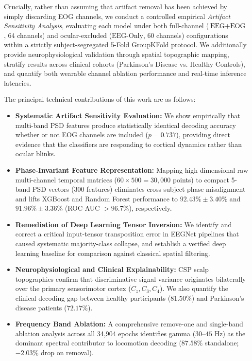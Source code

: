 \documentclass[11pt,a4paper]{article}
\begin{document}
Crucially, rather than assuming that artifact removal has been achieved by simply discarding EOG channels, we conduct a controlled empirical \textit{Artifact Sensitivity Analysis}, evaluating each model under both full-channel ($\text{EEG}+\text{EOG}$, 64 channels) and ocular-excluded ($\text{EEG-Only}$, 60 channels) configurations within a strictly subject-segregated 5-Fold GroupKFold protocol. We additionally provide neurophysiological validation through spatial topographic mapping, stratify results across clinical cohorts (Parkinson's Disease vs. Healthy Controls), and quantify both wearable channel ablation performance and real-time inference latencies.

The principal technical contributions of this work are as follows:
\begin{itemize}
    \item \textbf{Systematic Artifact Sensitivity Evaluation:} We show empirically that multi-band PSD features produce statistically identical decoding accuracy whether or not EOG channels are included ($p = 0.737$), providing direct evidence that the classifiers are responding to cortical dynamics rather than ocular blinks.
    \item \textbf{Phase-Invariant Feature Representation:} Mapping high-dimensional raw multi-channel temporal matrices ($60 \times 500 = 30{,}000$ points) to compact 5-band PSD vectors ($300$ features) eliminates cross-subject phase misalignment and lifts XGBoost and Random Forest performance to $92.43\% \pm 3.40\%$ and $91.96\% \pm 3.36\%$ (ROC-AUC $>96.7\%$), respectively.
    \item \textbf{Remediation of Deep Learning Tensor Inversion:} We identify and correct a critical input-tensor transposition error in EEGNet pipelines that caused systematic majority-class collapse, and establish a verified deep learning baseline for comparison against classical spatial filtering.
    \item \textbf{Neurophysiological and Clinical Explainability:} CSP scalp topographies confirm that discriminative signal variance originates bilaterally over the primary sensorimotor cortex ($C_z, C_3, C_4$). We also quantify the clinical decoding gap between healthy participants ($81.50\%$) and Parkinson's disease patients ($72.17\%$).
    \item \textbf{Frequency Band Ablation:} A comprehensive remove-one and single-band ablation analysis across all 34,904 epochs identifies gamma ($30\text{--}45\text{ Hz}$) as the dominant spectral contributor to locomotion decoding ($87.58\%$ standalone; $-2.03\%$ drop on removal).

\end{itemize}
\end{document}
